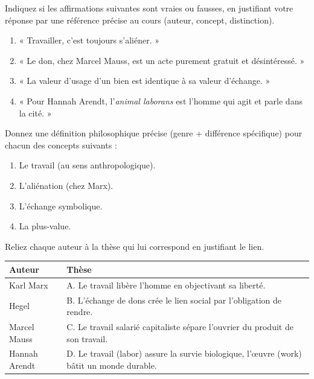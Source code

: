\documentclass[11pt]{article}
\begin{document}
\begin{exercice}
Indiquez si les affirmations suivantes sont vraies ou fausses, en justifiant votre réponse par une référence précise au cours (auteur, concept, distinction).
\begin{enumerate}
    \item « Travailler, c'est toujours s'aliéner. »
    \item « Le don, chez Marcel Mauss, est un acte purement gratuit et désintéressé. »
    \item « La valeur d'usage d'un bien est identique à sa valeur d'échange. »
    \item « Pour Hannah Arendt, l'\emph{animal laborans} est l'homme qui agit et parle dans la cité. »
\end{enumerate}
\end{exercice}

\begin{exercice}
Donnez une définition philosophique précise (genre + différence spécifique) pour chacun des concepts suivants :
\begin{enumerate}
    \item Le travail (au sens anthropologique).
    \item L'aliénation (chez Marx).
    \item L'échange symbolique.
    \item La plus-value.
\end{enumerate}
\end{exercice}

\begin{exercice}
Reliez chaque auteur à la thèse qui lui correspond en justifiant le lien.
\begin{center}
\begin{tabularx}{\linewidth}{|l|X|}\hline
\textbf{Auteur} & \textbf{Thèse} \\ \hline
Karl Marx & A. Le travail libère l'homme en objectivant sa liberté. \\ \hline
Hegel & B. L'échange de dons crée le lien social par l'obligation de rendre. \\ \hline
Marcel Mauss & C. Le travail salarié capitaliste sépare l'ouvrier du produit de son travail. \\ \hline
Hannah Arendt & D. Le travail (labor) assure la survie biologique, l'œuvre (work) bâtit un monde durable. \\ \hline
\end{tabularx}
\end{center}
\end{exercice}
\end{document}
